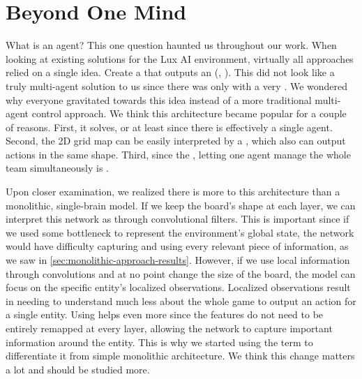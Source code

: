 \section{Beyond One Mind}
\label{ch:disc-beyond-one-mind}

\noindent What is an agent? This one question haunted us throughout our work. When looking at existing solutions for the Lux AI environment, virtually all approaches relied on a single idea. Create a  that outputs an  (\cite{chen2023emergent}, \cite{ferdinand}). This did not look like a truly multi-agent solution to us since there was only  with a very . We wondered why everyone gravitated towards this idea instead of a more traditional multi-agent control approach. We think this architecture became popular for a couple of reasons. First, it solves, or at least  since there is effectively a single agent. Second, the 2D grid map can be easily interpreted by a , which also can output actions in the same shape. Third, since the , letting one agent manage the whole team simultaneously is .

\bigskip

\noindent Upon closer examination, we realized there is more to this architecture than a monolithic, single-brain model. If we keep the board's shape at each layer, we can interpret this network as  through convolutional filters. This is important since if we used some bottleneck to represent the environment's global state, the network would have difficulty capturing and using every relevant piece of information, as we saw in \autoref{sec:monolithic-approach-results}. However, if we use local information through convolutions and at no point change the size of the board, the model can focus on the specific entity's localized observations. Localized observations result in needing to understand much less about the whole game to output an action for a single entity. Using  helps even more since the features do not need to be entirely remapped at every layer, allowing the network to capture important information around the entity. This is why we started using the term  to differentiate it from simple monolithic architecture. We think this change matters a lot and should be studied more.

